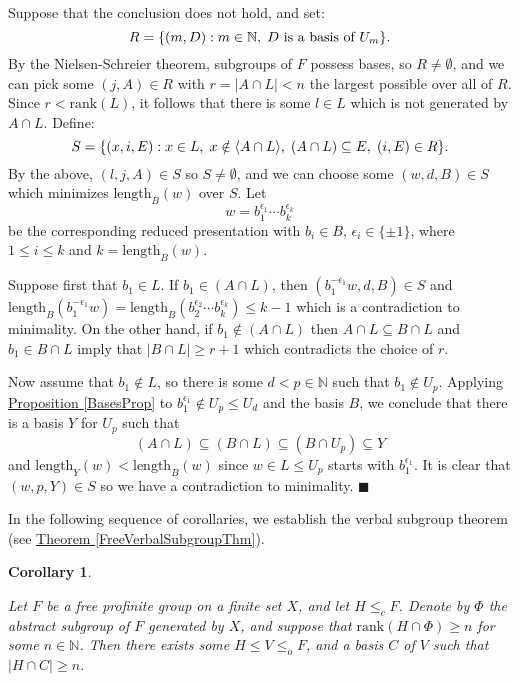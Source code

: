 \documentclass[12pt,a4paper]{article}
\newtheorem{corollary}[theorem]{Corollary}
\newenvironment{proof}[1][Proof]{\begin{trivlist}
\item[\hskip \labelsep {\bfseries #1}]}{\end{trivlist}}
\newcommand{\thmref}[1]{\hyperref[#1]{Theorem \ref*{#1}}}
\newcommand{\propref}[1]{\hyperref[#1]{Proposition \ref*{#1}}}
\newcommand{\rank}{\text{rank}}
\begin{document}
\begin{proof}

Suppose that the conclusion does not hold, and set: $$R = \{(m,D) : m \in \mathbb{N}, \hspace{1mm} D \text{ is a basis of } U_m \}.$$ By the Nielsen-Schreier theorem, subgroups of $F$ possess bases, so $R \neq \emptyset$, and we can pick some $(j,A) \in R$ with $r = |A \cap L| < n$ the largest possible over all of $R$. Since $r < \rank(L)$, it follows that there is some $l \in L$ which is not generated by $A \cap L$. Define: $$S = \{ (x,i,E) : x \in L, \hspace{1mm} x \notin \langle A \cap L \rangle, \hspace{1mm} (A \cap L) \subseteq E, \hspace{1mm} (i,E) \in R  \}.$$ By the above, $(l,j,A) \in S$ so $S \neq \emptyset$, and we can choose some $(w,d,B) \in S$ which minimizes $\text{length}_B(w)$ over $S$. Let $$w = b_1^{\epsilon_1} \dotsi b_k^{\epsilon_k}$$ be the corresponding reduced presentation with $b_i \in B$, $\epsilon_i \in \{\pm 1\}$, where $1 \leq i \leq k$ and $k = \text{length}_B(w)$.

Suppose first that $b_1 \in L$. If $b_1 \in (A \cap L)$, then $(b_1^{-\epsilon_1}w,d,B) \in S$ and $\text{length}_B(b_1^{-\epsilon_1}w) = \text{length}_B(b_2^{\epsilon_2} \dotsi b_k^{\epsilon_k}) \leq k - 1$ which is a contradiction to minimality. On the other hand, if $b_1 \notin (A \cap L)$ then $A \cap L \subseteq B \cap L$ and $b_1 \in B \cap L$ imply that $|B \cap L| \geq r + 1$ which contradicts the choice of $r$.

Now assume that $b_1 \notin L$, so there is some $d < p \in \mathbb{N}$ such that $b_1 \notin U_p$. Applying \propref{BasesProp} to $b_1^{\epsilon_1} \notin U_p \leq U_d$ and the basis $B$, we conclude that there is a basis $Y$ for $U_p$ such that $$(A \cap L) \subseteq (B \cap L) \subseteq (B \cap U_p) \subseteq Y$$ and $\text{length}_Y(w) < \text{length}_B(w)$ since $w \in L \leq U_p$ starts with $b_1^{\epsilon_1}$. It is clear that $(w,p,Y) \in S$ so we have a contradiction to minimality. $\blacksquare$

\end{proof}

In the following sequence of corollaries, we establish the verbal subgroup theorem (see \thmref{FreeVerbalSubgroupThm}).

\begin{corollary} \label{ChangeVarCor}

Let $F$ be a free profinite group on a finite set $X$, and let $H \leq_c F$. Denote by $\Phi$ the abstract subgroup of $F$ generated by $X$, and suppose that $\rank(H \cap \Phi) \geq n$ for some $n \in \mathbb{N}$. Then there exists some $H \leq V \leq_o F$, and a basis $C$ of $V$ such that $|H \cap C| \geq n$.

\end{corollary}
\end{document}
